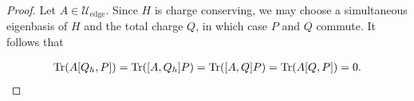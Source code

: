 \documentclass[12pt, letterpaper]{article}
\begin{document}
\begin{proof}

Let $A \in \mathcal{U}_{\text{edge}}$. Since $H$ is charge conserving, we may choose a simultaneous eigenbasis of $H$ and the total charge $Q$, in which case $P$ and $Q$ commute. It follows that

\[\begin{aligned}
\text{Tr}(A[Q_h, P]) = \text{Tr}([A, Q_h] P) = \text{Tr}([A, Q]P) = \text{Tr}(A[Q,P]) = 0.
\end{aligned}\]








\end{proof}
\end{document}
